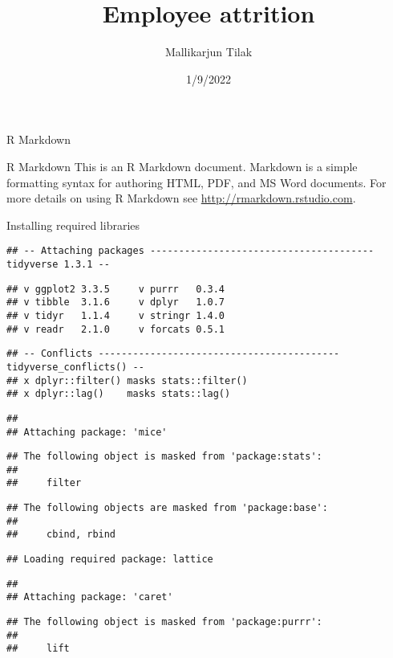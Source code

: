 \documentclass[
  ignorenonframetext,
]{beamer}
\title{Employee attrition}
\author{Mallikarjun Tilak}
\date{1/9/2022}
\begin{document}
\frame{\titlepage}

\begin{frame}{R Markdown}
\protect\hypertarget{r-markdown}{}
\end{frame}

\begin{frame}[fragile]{R Markdown}
\protect\hypertarget{r-markdown-1}{}
This is an R Markdown document. Markdown is a simple formatting syntax
for authoring HTML, PDF, and MS Word documents. For more details on
using R Markdown see \url{http://rmarkdown.rstudio.com}.

Installing required libraries

\begin{verbatim}
## -- Attaching packages --------------------------------------- tidyverse 1.3.1 --
\end{verbatim}

\begin{verbatim}
## v ggplot2 3.3.5     v purrr   0.3.4
## v tibble  3.1.6     v dplyr   1.0.7
## v tidyr   1.1.4     v stringr 1.4.0
## v readr   2.1.0     v forcats 0.5.1
\end{verbatim}

\begin{verbatim}
## -- Conflicts ------------------------------------------ tidyverse_conflicts() --
## x dplyr::filter() masks stats::filter()
## x dplyr::lag()    masks stats::lag()
\end{verbatim}

\begin{verbatim}
## 
## Attaching package: 'mice'
\end{verbatim}

\begin{verbatim}
## The following object is masked from 'package:stats':
## 
##     filter
\end{verbatim}

\begin{verbatim}
## The following objects are masked from 'package:base':
## 
##     cbind, rbind
\end{verbatim}

\begin{verbatim}
## Loading required package: lattice
\end{verbatim}

\begin{verbatim}
## 
## Attaching package: 'caret'
\end{verbatim}

\begin{verbatim}
## The following object is masked from 'package:purrr':
## 
##     lift
\end{verbatim}


\end{frame}
\end{document}
